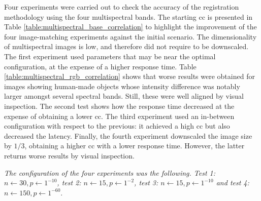 Four experiments were carried out to check the accuracy of the registration methodology using the four multispectral bands. The starting \acrshort{cc} is presented in Table \ref{table:multispectral_base_correlation} to highlight the improvement of the four image-matching experiments against the initial scenario. The dimensionality of multispectral images is low, and therefore did not require to be downscaled. The first experiment used parameters that may be near the optimal configuration, at the expense of a higher response time. Table \ref{table:multispectral_rgb_correlation} shows that worse results were obtained for images showing human-made objects whose intensity difference was notably larger amongst several spectral bands. Still, these were well aligned by visual inspection. The second test shows how the response time decreased at the expense of obtaining a lower \acrshort{cc}. The third experiment used an in-between configuration with respect to the previous: it achieved a high \acrshort{cc} but also decreased the latency. Finally, the fourth experiment downscaled the image size by $1/3$, obtaining a higher \acrshort{cc} with a lower response time. However, the latter returns worse results by visual inspection.

\textit{The configuration of the four experiments was the following. Test 1: $n \gets 30, p \gets 1^{-10}$, test 2: $n \gets 15, p \gets 1^{-2}$, test 3: $n \gets 15, p \gets 1^{-10}$ and test 4: $n \gets 150, p \gets 1^{-60}$}.

